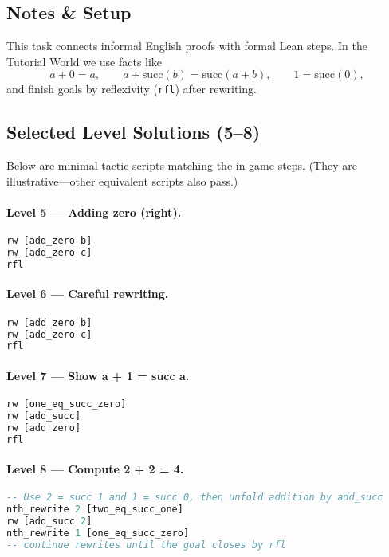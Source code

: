 \documentclass{article}
\theoremstyle{theorem}
\theoremstyle{definition}
\theoremstyle{remark}
\begin{document}
\subsection{Notes \& Setup}
This task connects informal English proofs with formal Lean steps. In the Tutorial World we use facts like
\[
a+0=a,\qquad a+\mathrm{succ}(b)=\mathrm{succ}(a+b),\qquad 1=\mathrm{succ}(0),
\]
and finish goals by reflexivity (\texttt{rfl}) after rewriting.

\subsection{Selected Level Solutions (5--8)}
Below are minimal tactic scripts matching the in-game steps. (They are illustrative—other equivalent scripts also pass.)

\paragraph{Level 5 — Adding zero (right).}
\begin{lstlisting}[language=Haskell]
rw [add_zero b]
rw [add_zero c]
rfl
\end{lstlisting}

\paragraph{Level 6 — Careful rewriting.}
\begin{lstlisting}[language=Haskell]
rw [add_zero b]
rw [add_zero c]
rfl
\end{lstlisting}

\paragraph{Level 7 — Show  a + 1 = succ a.}
\begin{lstlisting}[language=Haskell]
rw [one_eq_succ_zero]
rw [add_succ]
rw [add_zero]
rfl
\end{lstlisting}

\paragraph{Level 8 — Compute 2 + 2 = 4.}
\begin{lstlisting}[language=Haskell]
-- Use 2 = succ 1 and 1 = succ 0, then unfold addition by add_succ
nth_rewrite 2 [two_eq_succ_one]
rw [add_succ 2]
nth_rewrite 1 [one_eq_succ_zero]
-- continue rewrites until the goal closes by rfl
\end{lstlisting}
\end{document}
